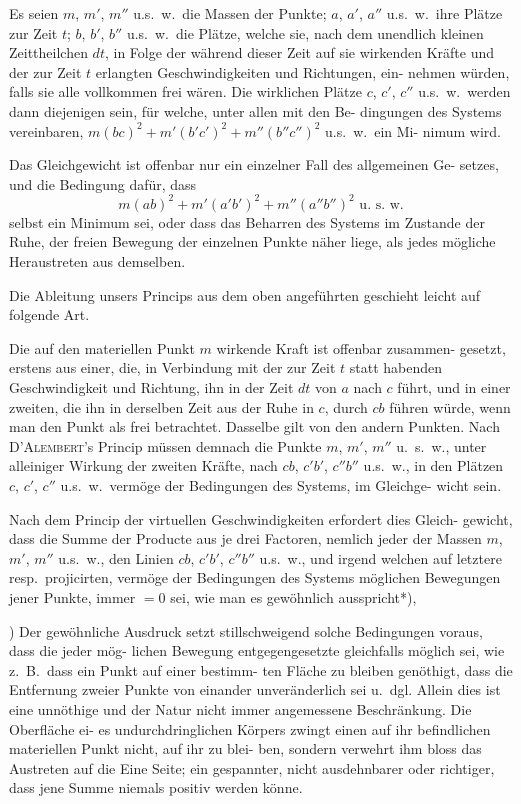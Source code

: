 \documentclass[12pt,a4paper]{article}
\theoremstyle{gauss}
\begin{document}
Es seien $m$, $m'$, $m''$ u.s.~w.~die Massen der Punkte; $a$, $a'$, $a''$ u.s.~w.~ihre
Pl\"atze zur Zeit $t$; $b$, $b'$, $b''$ u.s.~w.~die Pl\"atze, welche sie, nach dem unendlich
kleinen Zeittheilchen $dt$, in Folge der w\"ahrend dieser Zeit auf sie wirkenden
Kr\"afte und der zur Zeit $t$ erlangten Geschwindigkeiten und Richtungen, ein-
nehmen w\"urden, falls sie alle vollkommen frei w\"aren. Die wirklichen Pl\"atze
$c$, $c'$, $c''$ u.s.~w.~werden dann diejenigen sein, f\"ur welche, unter allen mit den Be-
dingungen des Systems vereinbaren, $m(bc)^2 + m'(b'c')^2 + m''(b''c'')^2$ u.s.~w.~ein Mi-
nimum wird.

\newpage
\setcounter{page}{30}

Das Gleichgewicht ist offenbar nur ein einzelner Fall des allgemeinen Ge-
setzes, und die Bedingung daf\"ur, dass
\[
m(ab)^2 + m'(a'b')^2 + m''(a''b'')^2 \text{ u.~s.~w.}
\]
selbst ein Minimum sei, oder dass das Beharren des Systems im Zustande der
Ruhe, der freien Bewegung der einzelnen Punkte n\"aher liege, als jedes m\"ogliche
Heraustreten aus demselben.

Die Ableitung unsers Princips aus dem oben angef\"uhrten geschieht leicht
auf folgende Art.

Die auf den materiellen Punkt $m$ wirkende Kraft ist offenbar zusammen-
gesetzt, erstens aus einer, die, in Verbindung mit der zur Zeit $t$ statt habenden
Geschwindigkeit und Richtung, ihn in der Zeit $dt$ von $a$ nach $c$ f\"uhrt, und in
einer zweiten, die ihn in derselben Zeit aus der Ruhe in $c$, durch $cb$ f\"uhren
w\"urde, wenn man den Punkt als frei betrachtet. Dasselbe gilt von den andern
Punkten. Nach \textsc{D'Alembert}'s Princip m\"ussen demnach die Punkte $m$, $m'$, $m''$ u.~s.~w.,
unter alleiniger Wirkung der zweiten Kr\"afte, nach $cb$, $c'b'$, $c''b''$ u.s.~w., in den
Pl\"atzen $c$, $c'$, $c''$ u.s.~w.~verm\"oge der Bedingungen des Systems, im Gleichge-
wicht sein.

Nach dem Princip der virtuellen Geschwindigkeiten erfordert dies Gleich-
gewicht, dass die Summe der Producte aus je drei Factoren, nemlich jeder der
Massen $m$, $m'$, $m''$ u.s.~w., den Linien $cb$, $c'b'$, $c''b''$ u.s.~w., und irgend welchen
auf letztere resp.~projicirten, verm\"oge der Bedingungen des Systems m\"oglichen
Bewegungen jener Punkte, immer $=0$ sei, wie man es gew\"ohnlich ausspricht*),

\vspace{8pt}
{\footnotesize *) Der gew\"ohnliche Ausdruck setzt stillschweigend solche Bedingungen voraus, dass die jeder m\"og-
lichen Bewegung entgegengesetzte gleichfalls m\"oglich sei, wie z.~B.~dass ein Punkt auf einer bestimm-
ten Fl\"ache zu bleiben gen\"othigt, dass die Entfernung zweier Punkte von einander unver\"anderlich sei u.~dgl.
Allein dies ist eine unn\"othige und der Natur nicht immer angemessene Beschr\"ankung. Die Oberfl\"ache ei-
es undurchdringlichen K\"orpers zwingt einen auf ihr befindlichen materiellen Punkt nicht, auf ihr zu blei-
ben, sondern verwehrt ihm bloss das Austreten auf die Eine Seite; ein gespannter, nicht ausdehnbarer
oder richtiger, dass jene Summe niemals positiv werden k\"onne.}
\end{document}
